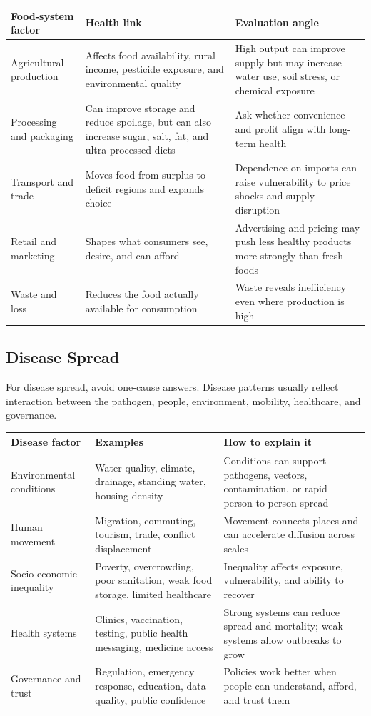 \documentclass[11pt,a4paper]{article}
\begin{document}
\begin{tabularx}{\textwidth}{L{0.2\textwidth}Y Y}
\toprule
\textbf{Food-system factor} & \textbf{Health link} & \textbf{Evaluation angle} \\
\midrule
Agricultural production & Affects food availability, rural income, pesticide
exposure, and environmental quality & High output can improve supply but may
increase water use, soil stress, or chemical exposure \\
Processing and packaging & Can improve storage and reduce spoilage, but can
also increase sugar, salt, fat, and ultra-processed diets & Ask whether
convenience and profit align with long-term health \\
Transport and trade & Moves food from surplus to deficit regions and expands
choice & Dependence on imports can raise vulnerability to price shocks and
supply disruption \\
Retail and marketing & Shapes what consumers see, desire, and can afford &
Advertising and pricing may push less healthy products more strongly than
fresh foods \\
Waste and loss & Reduces the food actually available for consumption & Waste
reveals inefficiency even where production is high \\
\bottomrule
\end{tabularx}

\subsection{Disease Spread}

For disease spread, avoid one-cause answers. Disease patterns usually reflect
interaction between the pathogen, people, environment, mobility, healthcare,
and governance.

\begin{tabularx}{\textwidth}{L{0.19\textwidth}Y Y}
\toprule
\textbf{Disease factor} & \textbf{Examples} & \textbf{How to explain it} \\
\midrule
Environmental conditions & Water quality, climate, drainage, standing water,
housing density & Conditions can support pathogens, vectors, contamination, or
rapid person-to-person spread \\
Human movement & Migration, commuting, tourism, trade, conflict displacement &
Movement connects places and can accelerate diffusion across scales \\
Socio-economic inequality & Poverty, overcrowding, poor sanitation, weak food
storage, limited healthcare & Inequality affects exposure, vulnerability, and
ability to recover \\
Health systems & Clinics, vaccination, testing, public health messaging,
medicine access & Strong systems can reduce spread and mortality; weak systems
allow outbreaks to grow \\
Governance and trust & Regulation, emergency response, education, data
quality, public confidence & Policies work better when people can understand,
afford, and trust them \\
\bottomrule
\end{tabularx}
\end{document}
